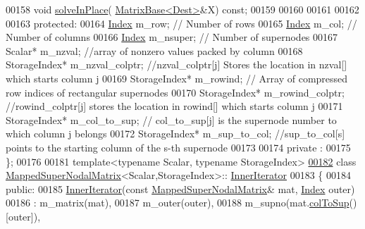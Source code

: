 \begin{DoxyCode}
00158     \textcolor{keywordtype}{void} \hyperlink{group___sparse_l_u___module_ab93581127fd87b6bc467b6f67fcf4eeb}{solveInPlace}( \hyperlink{group___core___module_class_eigen_1_1_matrix_base}{MatrixBase<Dest>}&X) \textcolor{keyword}{const};
00159     
00160       
00161       
00162     
00163   \textcolor{keyword}{protected}:
00164     \hyperlink{namespace_eigen_a62e77e0933482dafde8fe197d9a2cfde}{Index} m\_row; \textcolor{comment}{// Number of rows}
00165     \hyperlink{namespace_eigen_a62e77e0933482dafde8fe197d9a2cfde}{Index} m\_col; \textcolor{comment}{// Number of columns}
00166     \hyperlink{namespace_eigen_a62e77e0933482dafde8fe197d9a2cfde}{Index} m\_nsuper; \textcolor{comment}{// Number of supernodes}
00167     Scalar* m\_nzval; \textcolor{comment}{//array of nonzero values packed by column}
00168     StorageIndex* m\_nzval\_colptr; \textcolor{comment}{//nzval\_colptr[j] Stores the location in nzval[] which starts column j}
00169     StorageIndex* m\_rowind; \textcolor{comment}{// Array of compressed row indices of rectangular supernodes}
00170     StorageIndex* m\_rowind\_colptr; \textcolor{comment}{//rowind\_colptr[j] stores the location in rowind[] which starts column j}
00171     StorageIndex* m\_col\_to\_sup; \textcolor{comment}{// col\_to\_sup[j] is the supernode number to which column j belongs}
00172     StorageIndex* m\_sup\_to\_col; \textcolor{comment}{//sup\_to\_col[s] points to the starting column of the s-th supernode}
00173     
00174   private :
00175 \};
00176 
00181 \textcolor{keyword}{template}<\textcolor{keyword}{typename} Scalar, \textcolor{keyword}{typename} StorageIndex>
\hyperlink{class_eigen_1_1internal_1_1_mapped_super_nodal_matrix_1_1_inner_iterator}{00182} \textcolor{keyword}{class }\hyperlink{group___sparse_l_u___module_class_eigen_1_1internal_1_1_mapped_super_nodal_matrix}{MappedSuperNodalMatrix}<Scalar,StorageIndex>::
      \hyperlink{class_eigen_1_1internal_1_1_mapped_super_nodal_matrix_1_1_inner_iterator}{InnerIterator}
00183 \{
00184   \textcolor{keyword}{public}:
00185      \hyperlink{class_eigen_1_1internal_1_1_mapped_super_nodal_matrix_1_1_inner_iterator}{InnerIterator}(\textcolor{keyword}{const} \hyperlink{group___sparse_l_u___module_class_eigen_1_1internal_1_1_mapped_super_nodal_matrix}{MappedSuperNodalMatrix}& mat, 
      \hyperlink{namespace_eigen_a62e77e0933482dafde8fe197d9a2cfde}{Index} outer)
00186       : m\_matrix(mat),
00187         m\_outer(outer),
00188         m\_supno(mat.\hyperlink{group___sparse_l_u___module_a1e2c012b63809715188aa7f0c722868d}{colToSup}()[outer]),

\end{DoxyCode}
